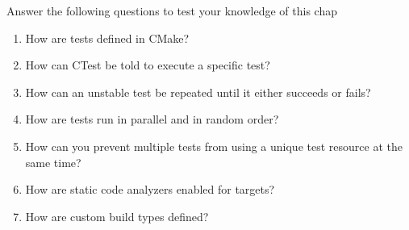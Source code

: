 Answer the following questions to test your knowledge of this chap

\begin{enumerate}
\item 
How are tests defined in CMake?

\item 
How can CTest be told to execute a specific test?

\item 
How can an unstable test be repeated until it either succeeds or fails?

\item 
How are tests run in parallel and in random order?

\item 
How can you prevent multiple tests from using a unique test resource at the same time?

\item 
How are static code analyzers enabled for targets?

\item 
How are custom build types defined?
\end{enumerate}